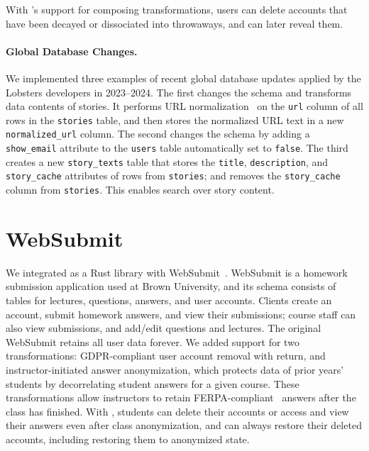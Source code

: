 %
With \sys's support for composing \xxing transformations, users can
delete accounts that have been decayed or dissociated into throwaways, and
can later reveal them.

%

\paragraph{Global Database Changes.}
\label{s:casestudies:updates}
We implemented three examples of recent global database updates applied by the
Lobsters developers in 2023--2024. 
%
The first changes the schema and transforms data contents of stories. It
performs URL normalization~\cite{urinorm} on the \texttt{url} column of all rows
in the \texttt{stories} table, and then stores the normalized URL text in a new
\texttt{normalized\_url} column.
%
%
The second changes the schema by adding a \texttt{show\_email} attribute to the
\texttt{users} table automatically set to \texttt{false}. 
%
The third creates a new \texttt{story\_texts} table that stores the
\texttt{title}, \texttt{description}, and \texttt{story\_cache} attributes of
rows from \texttt{stories}; and removes the \texttt{story\_cache} column from
\texttt{stories}. This enables search over story content.

\section{WebSubmit}
\label{s:case-websubmit}

%
We integrated \sys as a Rust library with WebSubmit~\cite{websubmit-rs}.
%
WebSubmit is a homework submission application used at Brown University, and
its schema consists of tables for lectures, questions, answers, and user accounts.
%
Clients create an account, submit homework answers, and view their submissions;
course staff can also view submissions, and add/edit questions and lectures.
%
The original WebSubmit retains all user data forever.
%
We added support for two \xxing
transformations: {GDPR-compliant user account removal} with return, and
{instructor-initiated answer anonymization}, which protects data of prior years'
students by decorrelating student answers for a given course.
%
These transformations allow instructors to retain FERPA-compliant~\cite{ferpa}
answers after the class has finished. %
%
With \sys, students can delete their
accounts or access and view their answers even after class anonymization,
and can always restore their deleted accounts, including restoring them to
anonymized state.
%
%


